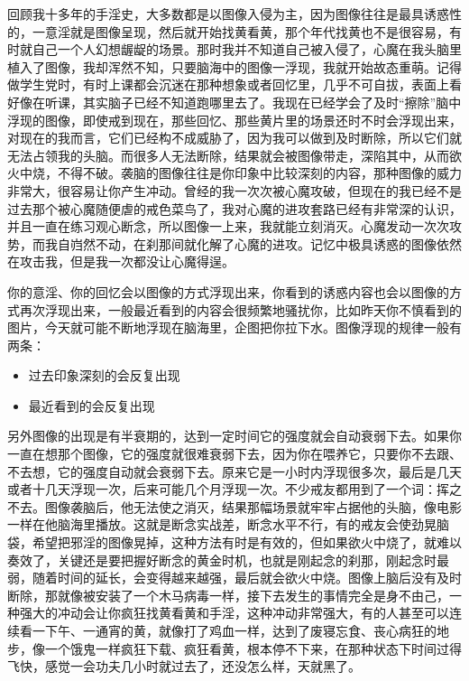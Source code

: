 回顾我十多年的手淫史，大多数都是以图像入侵为主，因为图像往往是最具诱惑性的，一意淫就是图像呈现，然后就开始找黄看黄，那个年代找黄也不是很容易，有时就自己一个人幻想龌龊的场景。那时我并不知道自己被入侵了，心魔在我头脑里植入了图像，我却浑然不知，只要脑海中的图像一浮现，我就开始故态重萌。记得做学生党时，有时上课都会沉迷在那种想象或者回忆里，几乎不可自拔，表面上看好像在听课，其实脑子已经不知道跑哪里去了。我现在已经学会了及时“擦除”脑中浮现的图像，即使戒到现在，那些回忆、那些黄片里的场景还时不时会浮现出来，对现在的我而言，它们已经构不成威胁了，因为我可以做到及时断除，所以它们就无法占领我的头脑。而很多人无法断除，结果就会被图像带走，深陷其中，从而欲火中烧，不得不破。袭脑的图像往往是你印象中比较深刻的内容，那种图像的威力非常大，很容易让你产生冲动。曾经的我一次次被心魔攻破，但现在的我已经不是过去那个被心魔随便虐的戒色菜鸟了，我对心魔的进攻套路已经有非常深的认识，并且一直在练习观心断念，所以图像一上来，我就能立刻消灭。心魔发动一次次攻势，而我自岿然不动，在刹那间就化解了心魔的进攻。记忆中极具诱惑的图像依然在攻击我，但是我一次都没让心魔得逞。

你的意淫、你的回忆会以图像的方式浮现出来，你看到的诱惑内容也会以图像的方式再次浮现出来，一般最近看到的内容会很频繁地骚扰你，比如昨天你不慎看到的图片，今天就可能不断地浮现在脑海里，企图把你拉下水。图像浮现的规律一般有两条：

\begin{multicols}{2}
    \begin{itemize}
        \item 过去印象深刻的会反复出现
        \item 最近看到的会反复出现
    \end{itemize}
\end{multicols}

另外图像的出现是有半衰期的，达到一定时间它的强度就会自动衰弱下去。如果你一直在想那个图像，它的强度就很难衰弱下去，因为你在喂养它，只要你不去跟、不去想，它的强度自动就会衰弱下去。原来它是一小时内浮现很多次，最后是几天或者十几天浮现一次，后来可能几个月浮现一次。不少戒友都用到了一个词：挥之不去。图像袭脑后，他无法使之消灭，结果那幅场景就牢牢占据他的头脑，像电影一样在他脑海里播放。这就是断念实战差，断念水平不行，有的戒友会使劲晃脑袋，希望把邪淫的图像晃掉，这种方法有时是有效的，但如果欲火中烧了，就难以奏效了，关键还是要把握好断念的黄金时机，也就是刚起念的刹那，刚起念时最弱，随着时间的延长，会变得越来越强，最后就会欲火中烧。图像上脑后没有及时断除，那就像被安装了一个木马病毒一样，接下去发生的事情完全是身不由己，一种强大的冲动会让你疯狂找黄看黄和手淫，这种冲动非常强大，有的人甚至可以连续看一下午、一通宵的黄，就像打了鸡血一样，达到了废寝忘食、丧心病狂的地步，像一个饿鬼一样疯狂下载、疯狂看黄，根本停不下来，在那种状态下时间过得飞快，感觉一会功夫几小时就过去了，还没怎么样，天就黑了。

